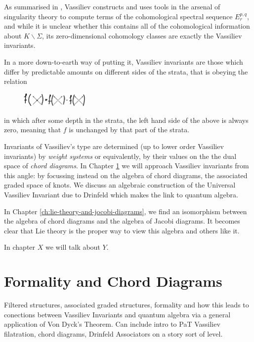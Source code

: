 \documentclass[12pt]{report}
\theoremstyle{regular}
\newcommand{\scaffold}[1]{
\begin{mdframed}[style=scaffold]
        {\color{teal}#1}
\end{mdframed}
}
\begin{document}
        As summarised in \cite{introduction-to-vassiliev-invariants}, Vassiliev constructs and uses tools in the arsenal of singularity theory to compute terms of the cohomological spectral sequence \(E^{p, q}_{r}\), and while it is unclear whether this contains all of the cohomological information about \(K \smallsetminus \Sigma\), its zero-dimensional cohomology classes are exactly the Vassiliev invariants.

        In a more down-to-earth way of putting it, Vassiliev invariants are those which differ by predictable amounts on different sides of the strata, that is obeying the relation
        \begin{figure}[H]
                \centering
                \includegraphics[width=0.3\textwidth]{graphics/vassiliev_relation.png}
        \end{figure}
        \noindent
        in which after some depth in the strata, the left hand side of the above is always zero, meaning that \(f\) is unchanged by that part of the strata.

        Invariants of Vassiliev's type are determined (up to lower order Vassiliev invariants) by \textit{weight systems} or equivalently, by their values on the the dual space of \textit{chord diagrams}. In Chapter \ref{ch:formality-and-chord-diagrams} we will approach Vassiliev invariants from this angle: by focussing instead on the algebra of chord diagrams, the associated graded space of knots. We discuss an algebraic construction of the Universal Vassiliev Invariant due to Drinfeld which makes the link to quantum algebra.

        In Chapter \ref{ch:lie-theory-and-jocobi-diagrams}, we find an isomorphism between the algebra of chord diagrams and the algebra of Jacobi diagrams. It becomes clear that Lie theory is the proper way to view this algebra and others like it.

        \scaffold{In chapter \(X\) we will talk about \(Y\).}

        \chapter{Formality and Chord Diagrams}
        \label{ch:formality-and-chord-diagrams}

        \scaffold{Filtered structures, associated graded structures, formality and how this leads to conections between Vassiliev Invariants and quantum algebra via a general application of Von Dyck's Theorem. Can include intro to PaT Vassiliev filatration, chord diagrams, Drinfeld Associators on a story sort of level.}
\end{document}
